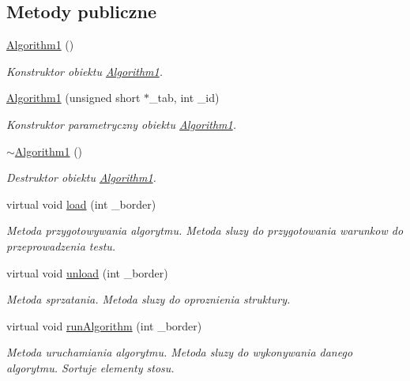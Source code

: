 \subsection*{Metody publiczne}
\begin{DoxyCompactItemize}
\item 
\hyperlink{class_algorithm1_ad2b1593378788a36b954b65d1c2af8ff}{Algorithm1} ()
\begin{DoxyCompactList}\small\item\em Konstruktor obiektu \hyperlink{class_algorithm1}{Algorithm1}. \end{DoxyCompactList}\item 
\hyperlink{class_algorithm1_a13f1f7ab415c372d8affcc683ec99240}{Algorithm1} (unsigned short $\ast$\-\_\-tab, int \-\_\-id)
\begin{DoxyCompactList}\small\item\em Konstruktor parametryczny obiektu \hyperlink{class_algorithm1}{Algorithm1}. \end{DoxyCompactList}\item 
\hyperlink{class_algorithm1_afbd4d69811879472fcadb25a1c3c5262}{$\sim$\-Algorithm1} ()
\begin{DoxyCompactList}\small\item\em Destruktor obiektu \hyperlink{class_algorithm1}{Algorithm1}. \end{DoxyCompactList}\item 
virtual void \hyperlink{class_algorithm1_a008c8fdd07c39219099afe14e63e447a}{load} (int \-\_\-border)
\begin{DoxyCompactList}\small\item\em Metoda przygotowywania algorytmu. Metoda sluzy do przygotowania warunkow do przeprowadzenia testu. \end{DoxyCompactList}\item 
virtual void \hyperlink{class_algorithm1_a135dd26c6c741812d75cd7f2f270592d}{unload} (int \-\_\-border)
\begin{DoxyCompactList}\small\item\em Metoda sprzatania. Metoda sluzy do oproznienia struktury. \end{DoxyCompactList}\item 
virtual void \hyperlink{class_algorithm1_a671a2162843b588704044420c9a5dfa9}{run\-Algorithm} (int \-\_\-border)
\begin{DoxyCompactList}\small\item\em Metoda uruchamiania algorytmu. Metoda sluzy do wykonywania danego algorytmu. Sortuje elementy stosu. \end{DoxyCompactList}\end{DoxyCompactItemize}
